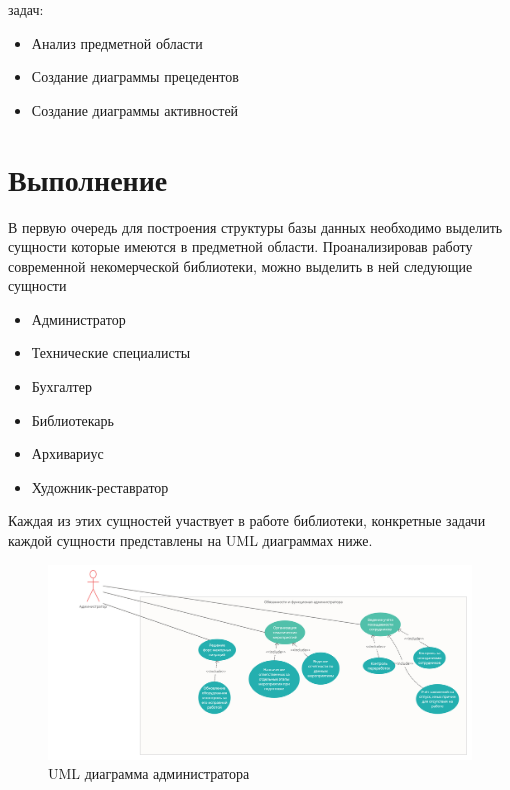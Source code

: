 \documentclass[14pt]{extreport}
\begin{document}
 задач:
\begin{itemize}
    \item Анализ предметной области 
    \item Создание диаграммы прецедентов
    \item Создание диаграммы активностей
\end{itemize}


\chapter{Выполнение}

В первую очередь для построения структуры базы данных необходимо выделить сущности которые имеются в предметной области. Проанализировав работу современной некомерческой библиотеки, можно выделить в ней следующие сущности 
\begin{itemize}
    \item Администратор
    \item Технические специалисты
    \item Бухгалтер
    \item Библиотекарь
    \item Архивариус
    \item Художник-реставратор
\end{itemize}

Каждая из этих сущностей участвует в работе библиотеки, конкретные задачи каждой сущности представлены на UML диаграммах ниже.
\begin{figure}[h!]
\centering
\includegraphics[width=1\linewidth]{admin.png}
\caption{UML диаграмма администратора}
\end{figure}

\newpage
\end{document}
